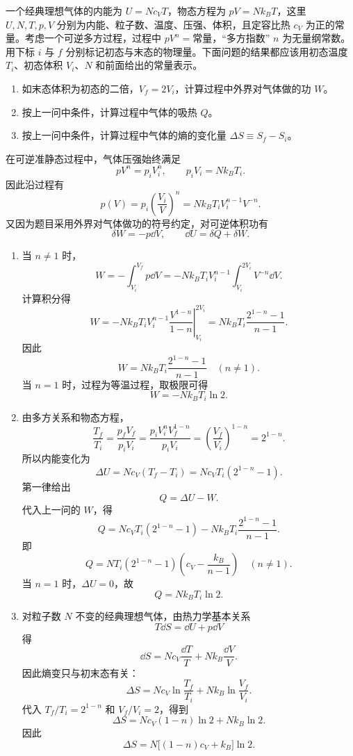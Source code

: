 
\begin{question}[25 分]
一个经典理想气体的内能为 $U=Nc_VT$，物态方程为 $pV=Nk_BT$，这里 $U,N,T,p,V$ 分别为内能、粒子数、温度、压强、体积，且定容比热 $c_V$ 为正的常量。考虑一个可逆多方过程，过程中 $pV^n=\text{常量}$，``多方指数'' $n$ 为无量纲常数。用下标 $i$ 与 $f$ 分别标记初态与末态的物理量。下面问题的结果都应该用初态温度 $T_i$、初态体积 $V_i$、$N$ 和前面给出的常量表示。
\begin{enumerate}
    \item 如末态体积为初态的二倍，$V_f=2V_i$，计算过程中外界对气体做的功 $W$。
    \item 按上一问中条件，计算过程中气体的吸热 $Q$。
    \item 按上一问中条件，计算过程中气体的熵的变化量 $\Delta S\equiv S_f-S_i$。
\end{enumerate}
\begin{solution}
在可逆准静态过程中，气体压强始终满足
\[
    pV^n=p_iV_i^n,
    \qquad
    p_iV_i=Nk_BT_i.
\]
因此沿过程有
\[
    p(V)=p_i\left(\frac{V_i}{V}\right)^n
    =Nk_BT_iV_i^{n-1}V^{-n}.
\]
又因为题目采用外界对气体做功的符号约定，对可逆体积功有
\[
    \delta W=-p\dd{V},
    \qquad
    \dd{U}=\delta Q+\delta W.
\]
\begin{enumerate}
    \item 当 $n\ne 1$ 时，
    \[
        W=-\int_{V_i}^{V_f}p\dd{V}
        =-Nk_BT_iV_i^{n-1}\int_{V_i}^{2V_i}V^{-n}\dd{V}.
    \]
    计算积分得
    \[
        W
        =-Nk_BT_iV_i^{n-1}\left.\frac{V^{1-n}}{1-n}\right|_{V_i}^{2V_i}
        =Nk_BT_i\frac{2^{1-n}-1}{n-1}.
    \]
    因此
    \[
        \boxed{W=Nk_BT_i\frac{2^{1-n}-1}{n-1}\quad(n\ne 1).}
    \]
    当 $n=1$ 时，过程为等温过程，取极限可得
    \[
        \boxed{W=-Nk_BT_i\ln 2.}
    \]

    \item 由多方关系和物态方程，
    \[
        \frac{T_f}{T_i}
        =\frac{p_fV_f}{p_iV_i}
        =\frac{p_iV_i^nV_f^{1-n}}{p_iV_i}
        =\left(\frac{V_f}{V_i}\right)^{1-n}
        =2^{1-n}.
    \]
    所以内能变化为
    \[
        \Delta U=Nc_V(T_f-T_i)=Nc_VT_i(2^{1-n}-1).
    \]
    第一律给出
    \[
        Q=\Delta U-W.
    \]
    代入上一问的 $W$，得
    \[
        Q=Nc_VT_i(2^{1-n}-1)-Nk_BT_i\frac{2^{1-n}-1}{n-1}.
    \]
    即
    \[
        \boxed{Q=NT_i(2^{1-n}-1)\left(c_V-\frac{k_B}{n-1}\right)\quad(n\ne 1).}
    \]
    当 $n=1$ 时，$\Delta U=0$，故
    \[
        \boxed{Q=Nk_BT_i\ln 2.}
    \]

    \item 对粒子数 $N$ 不变的经典理想气体，由热力学基本关系
    \[
        T\dd{S}=\dd{U}+p\dd{V}
    \]
    得
    \[
        \dd{S}=Nc_V\frac{\dd{T}}{T}+Nk_B\frac{\dd{V}}{V}.
    \]
    因此熵变只与初末态有关：
    \[
        \Delta S=Nc_V\ln\frac{T_f}{T_i}+Nk_B\ln\frac{V_f}{V_i}.
    \]
    代入 $T_f/T_i=2^{1-n}$ 和 $V_f/V_i=2$，得到
    \[
        \Delta S=Nc_V(1-n)\ln2+Nk_B\ln2.
    \]
    因此
    \[
        \boxed{\Delta S=N\bigl[(1-n)c_V+k_B\bigr]\ln2.}
    \]
\end{enumerate}
\end{solution}
\end{question}


